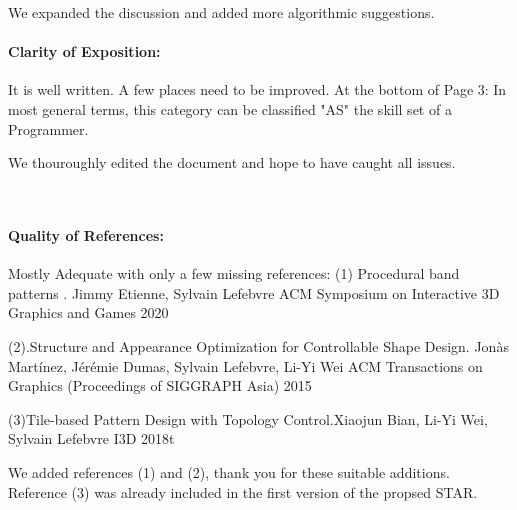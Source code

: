 \documentclass{egpubl}
\newcommand{\rev}[2]{{\color{greenrev}\textsuperscript{#1}#2}}
\renewcommand{\rev}[2]{{#2}}
\begin{document}
\rev{Comment}{We expanded the discussion and added more algorithmic suggestions.}

\paragraph*{Clarity of Exposition:} It is well written.  A few places need to be improved.
At the bottom of Page 3:  In most general terms, this category can be classified  "AS" the skill set of a Programmer.

\rev{}{We thouroughly edited the document and hope to have caught all issues.}

\
\paragraph*{Quality of References:} Mostly Adequate with only a few missing references:
(1)
Procedural band patterns . Jimmy Etienne, Sylvain Lefebvre
ACM Symposium on Interactive 3D Graphics and Games 2020

(2).Structure and Appearance Optimization for Controllable Shape Design.
Jonàs Martínez, Jérémie Dumas, Sylvain Lefebvre, Li-Yi Wei
ACM Transactions on Graphics (Proceedings of SIGGRAPH Asia) 2015

(3)Tile-based Pattern Design with Topology Control.Xiaojun Bian, Li-Yi Wei, Sylvain Lefebvre
I3D 2018t

\rev{Comment}{
    We added references (1) and (2), thank you for these suitable additions. Reference (3) was already included in the first version of the propsed STAR.
}





%  
%        




\printbibliography
\end{document}

